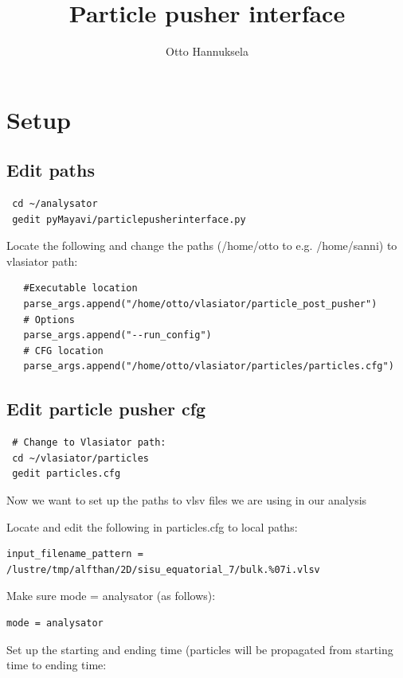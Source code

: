 \documentclass[a4paper,10pt]{article}
\title{Particle pusher interface}
\author{Otto Hannuksela}
\begin{document}
\maketitle

\section{Setup}

\subsection{Edit paths}

\begin{verbatim}
 cd ~/analysator
 gedit pyMayavi/particlepusherinterface.py
\end{verbatim}

Locate the following and change the paths (/home/otto to e.g. /home/sanni) to vlasiator path:

\begin{verbatim}
   #Executable location
   parse_args.append("/home/otto/vlasiator/particle_post_pusher")
   # Options
   parse_args.append("--run_config")
   # CFG location
   parse_args.append("/home/otto/vlasiator/particles/particles.cfg")
\end{verbatim}

\subsection{Edit particle pusher cfg}

\begin{verbatim}
 # Change to Vlasiator path:
 cd ~/vlasiator/particles
 gedit particles.cfg
\end{verbatim}

Now we want to set up the paths to vlsv files we are using in our analysis

Locate and edit the following in particles.cfg to local paths:

\begin{verbatim}
input_filename_pattern = /lustre/tmp/alfthan/2D/sisu_equatorial_7/bulk.%07i.vlsv
\end{verbatim}

Make sure mode = analysator (as follows):
\begin{verbatim}
mode = analysator
\end{verbatim}

Set up the starting and ending time (particles will be propagated from starting time to ending time:
\end{document}
